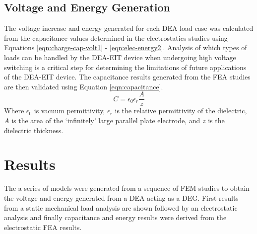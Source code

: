 \subsection{Voltage and Energy Generation}
The voltage increase and energy generated for each DEA load case was calculated from the capacitance values determined in the electrostatics studies using Equations \ref{eqn:charge-cap-volt1} - \ref{eqn:elec-energy2}. Analysis of which types of loads can be handled by the DEA-EIT device when undergoing high voltage switching is a critical step for determining the limitations of future applications of the DEA-EIT device. The capacitance results generated from the FEA studies are then validated using Equation \ref{eqn:capacitance}.
\begin{equation}
	C = \epsilon_0 \epsilon_r \frac{A}{z}
	\label{eqn:capacitance}
\end{equation}
Where $\epsilon_0$ is vacuum permittivity, $\epsilon_r$ is the relative permittivity of the dielectric, $A$ is the area of the `infinitely' large parallel plate electrode, and $z$ is the dielectric thickness.


\section{Results}
\label{sec:results}
The a series of models were generated from a sequence of FEM studies to obtain the voltage and energy generated from a DEA acting as a DEG. First results from a static mechanical load analysis are shown followed by an electrostatic analysis and finally capacitance and energy results were derived from the electrostatic FEA results.


